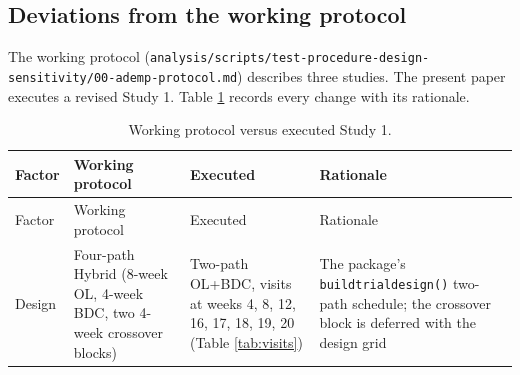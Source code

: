 \documentclass[
  11pt,
]{article}
\begin{document}
\subsection{Deviations from the working protocol}\label{deviations-from-the-working-protocol}

The working protocol
(\texttt{analysis/scripts/test-procedure-design-sensitivity/00-ademp-protocol.md})
describes three studies. The present paper executes a revised Study
1. Table \ref{tab:deviations} records every change with its
rationale.

\begin{longtable}[]{@{}
  >{\raggedright\arraybackslash}p{}
  >{\raggedright\arraybackslash}p{}
  >{\raggedright\arraybackslash}p{}
  >{\raggedright\arraybackslash}p{}@{}}
\caption{\label{tab:deviations} Working protocol versus executed Study 1.}\tabularnewline
\toprule\noalign{}
\begin{minipage}[b]{\linewidth}\raggedright
Factor
\end{minipage} & \begin{minipage}[b]{\linewidth}\raggedright
Working protocol
\end{minipage} & \begin{minipage}[b]{\linewidth}\raggedright
Executed
\end{minipage} & \begin{minipage}[b]{\linewidth}\raggedright
Rationale
\end{minipage} \\
\midrule\noalign{}
\endfirsthead
\toprule\noalign{}
\begin{minipage}[b]{\linewidth}\raggedright
Factor
\end{minipage} & \begin{minipage}[b]{\linewidth}\raggedright
Working protocol
\end{minipage} & \begin{minipage}[b]{\linewidth}\raggedright
Executed
\end{minipage} & \begin{minipage}[b]{\linewidth}\raggedright
Rationale
\end{minipage} \\
\midrule\noalign{}
\endhead
\bottomrule\noalign{}
\endlastfoot
Design & Four-path Hybrid (8-week OL, 4-week BDC, two 4-week crossover blocks) & Two-path OL+BDC, visits at weeks 4, 8, 12, 16, 17, 18, 19, 20 (Table \ref{tab:visits}) & The package's \texttt{buildtrialdesign()} two-path schedule; the crossover block is deferred with the design grid \\

\end{longtable}
\end{document}
